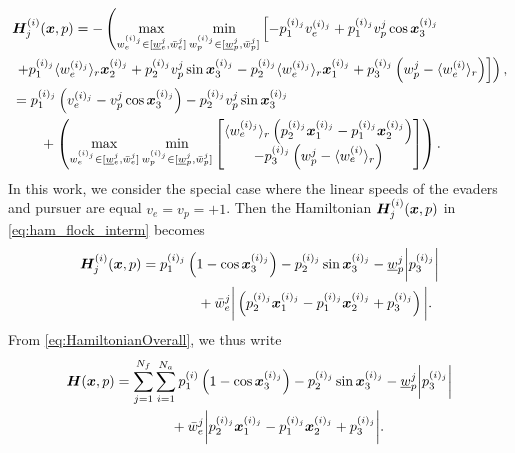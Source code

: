 \begin{align}
\begin{split}
&\hamfunc^{(i)}_j(\state, p)=- \left(\max_{w_e^{(i)_j} \in [\underline{w}_e^j, \bar{w}_e^j]}  \min_{w_p^{(i)_j}  \in [\underline{w}_p^{j}, \bar{w}_p^j]}  
\left[
-p_1^{(i)_j} v_e^{(i)_j} + p_1^{(i)_j} v_p^{j} \cos \state_3^{(i)_j} 
\right. \right.  \\ 
%
& \left. \left. +  p_1^{(i)_j}\langle w_e^{(i)_j} \rangle_r \state_2^{(i)_j} 
%
+ p_2^{(i)_j} v_p^{j} \sin \state_3^{(i)_j} - p_2^{(i)_j} \langle w_e^{(i)_j} \rangle_r  \state_1^{(i)_j} 
%
+ p_3^{(i)_j}\left(w_p^j - \langle w_e^{(i)} \rangle_r\right)
\right] 
%
\right),
\\
%
&=p_1^{(i)_j} \left(v_e^{(i)_j} - v_p^{j} \cos \state_3^{(i)_j}\right) -  p_2^{(i)_j} v_p^{j} \sin \state_3^{(i)_j}  \\
%
& \qquad + \left(		
\max_{w_e^{(i)_j} \in [\underline{w}_e^j, \bar{w}_e^j]}  \min_{w_p^{(i)_j}  \in [\underline{w}_p^{j}, \bar{w}_p^j]} \begin{bmatrix}
\langle w_e^{(i)_j}\rangle_r \left(p_2^{(i)_j} \state_1^{(i)_j} - p_1^{(i)_j}  \state_2^{(i)_j} \right) 
% 
\\ 
- p_3^{(i)_j} \left(w_p^j - \langle w_e^{(i)}\rangle_r\right)
\end{bmatrix}
\right).
\end{split}
%
\label{eq:ham_flock_interm}
\end{align}
%
In this work, we consider the special case where the linear speeds of the evaders and pursuer are equal \ie $v_e = v_p = +1$.  Then the Hamiltonian $\bm{H}^{(i)}_j(\bm{x}, p)$ in \eqref{eq:ham_flock_interm} becomes 
%
\begin{align}
\bm{H}^{(i)}_j(\bm{x}, p) &= p_1^{(i)_j} \left(1 - \cos \bm{x}_3^{(i)_j}\right) - p_2^{(i)_j} \sin \bm{x}_3^{(i)_j} - \underline{w}_p^j \bigg|p_3^{(i)_j}\bigg| \nonumber 	\\
& \qquad\qquad  
 + \bar{w}_e^j \bigg|\left(p_2^{(i)_j} \bm{x}_1^{(i)_j} - p_1^{(i)_j}\bm{x}_2^{(i)_j} + p_3^{(i)_j}\right)\bigg|  .
\end{align}
%
From \eqref{eq:HamiltonianOverall}, we thus write
%
\begin{align}
\hamfunc(\state, p) &= \sum_{j=1}^{N_f} \sum_{i=1}^{N_a} p_1^{(i)} \left(1 - \cos \state_3^{(i)_j}\right) - p_2^{(i)_j} \sin \state_3^{(i)_j} - \underline{w}_p^j \bigg|p_3^{(i)_j}\bigg|  \nonumber 	\\
& \qquad\qquad %
+ \bar{w}_e^j \bigg| p_2^{(i)_j} \state_1^{(i)_j} - p_1^{(i)_j}\state_2^{(i)_j} + p_3^{(i)_j}\bigg|.
\label{eq:HamiltonianCompletada}
\end{align}
%

